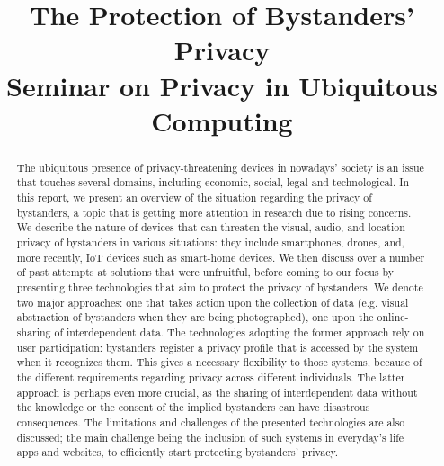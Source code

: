 \documentclass[conference, 11pt]{IEEEtran}
\begin{document}
\title{The Protection of Bystanders' Privacy\\Seminar on Privacy in Ubiquitous Computing}

\author{
\and
{} 
}

\maketitle
\thispagestyle{plain} %
\pagestyle{plain}    %

\begin{abstract}
The ubiquitous presence of privacy-threatening devices in nowadays' society is an issue that touches several domains, including economic, social, legal and technological. In this report, we present an overview of the situation regarding the privacy of bystanders, a topic that is getting more attention in research due to rising concerns. We describe the nature of devices that can threaten the visual, audio, and location privacy of bystanders in various situations: they include smartphones, drones, and, more recently, \ac{IoT} devices such as smart-home devices. We then discuss over a number of past attempts at solutions that were unfruitful, before coming to our focus by presenting three technologies that aim to protect the privacy of bystanders. We denote two major approaches: one that takes action upon the collection of data (e.g. visual abstraction of bystanders when they are being photographed), one upon the online-sharing of interdependent data. The technologies adopting the former approach rely on user participation: bystanders register a privacy profile that is accessed by the system when it recognizes them. This gives a necessary flexibility to those systems, because of the different requirements regarding privacy across different individuals. The latter approach is perhaps even more crucial, as the sharing of interdependent data without the knowledge or the consent of the implied bystanders can have disastrous consequences. The limitations and challenges of the presented technologies are also discussed; the main challenge being the inclusion of such systems in everyday's life apps and websites, to efficiently start protecting bystanders' privacy.
\end{abstract}
\end{document}
